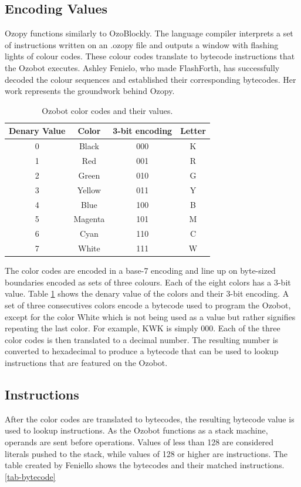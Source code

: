 \documentclass[oneside,%
                    author={Malak Hajji},
                    degree={BSc},
                    title={Designing An Accessible Computational Toolkit For Students},
                  subtitle={With Mixed Visual Abilities}]{dissertation}
\begin{document}
\subsection{Encoding Values}
Ozopy functions similarly to OzoBlockly. The language compiler interprets a set of instructions written on an .ozopy file and outputs a window with flashing lights  of colour codes. These colour codes translate to bytecode instructions that the Ozobot executes. Ashley Fenielo, who made FlashForth, has successfully decoded the colour sequences and established their corresponding bytecodes. Her work represents the groundwork behind Ozopy.
\FloatBarrier
\begin{table}[h]
\centering
\begin{tabular}{|c|c|c|c|}
\hline
\textbf{Denary Value}  &\textbf{Color}  & \textbf{3-bit encoding} &  \textbf{Letter}  \\ \hline
0     &Black &000 &K   \\ \hline
1    &Red   &001 &R            \\ \hline
2   &Green &010 &G               \\ \hline
3    &Yellow  & 011 &Y              \\ \hline
4   &Blue &100 &B                \\ \hline
5   &Magenta &101&M             \\ \hline
6   &Cyan & 110 & C                \\ \hline
7   &White & 111 &W               \\ \hline

\hline
\end{tabular}
\caption{Ozobot color codes and their values.}
\label{tab-colors}
\end{table}
\FloatBarrier
The color codes are encoded in a base-7 encoding and line up on byte-sized boundaries encoded as sets of three colours. Each of the eight colors has a 3-bit value. Table \ref{tab-colors} shows the denary value of the colors and their 3-bit encoding. A set of three consecutives colors encode a bytecode used to program the Ozobot, except for the color White which is not being used as a value but rather signifies repeating the last color. For example, KWK is simply 000. Each of the three color codes is then translated to a decimal number. The resulting number is converted to hexadecimal to produce a bytecode that can be used to lookup instructions that are featured on the Ozobot. 

\subsection{Instructions}
After the color codes are translated to bytecodes, the resulting bytecode value is used to lookup instructions. As the Ozobot functions as a stack machine, operands are sent before operations.
Values of less than 128 are considered literals pushed to the stack, while values of 128 or higher are instructions. The table created by Feniello shows the bytecodes and their matched instructions. \ref{tab-bytecode}
\end{document}

